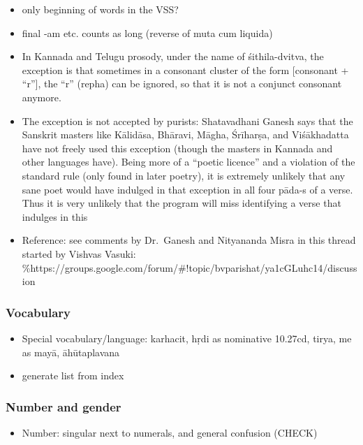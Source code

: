 \documentclass[11pt]{book}
\begin{document}
\begin{itemize}
\item
  only beginning of words in the VSS?
\item
  final -am etc. counts as long (reverse of muta cum liquida)
\item
  In Kannada and Telugu prosody, under the name of śithila-dvitva, the
  exception is that sometimes in a consonant cluster of the form
  {[}consonant + ``r''{]}, the ``r'' (repha) can be ignored, so that it
  is not a conjunct consonant anymore.
\item
  The exception is not accepted by purists: Shatavadhani Ganesh says
  that the Sanskrit masters like Kālidāsa, Bhāravi, Māgha, Śrīharṣa, and
  Viśākhadatta have not freely used this exception (though the masters
  in Kannada and other languages have). Being more of a ``poetic
  licence'' and a violation of the standard rule (only found in later
  poetry), it is extremely unlikely that any sane poet would have
  indulged in that exception in all four pāda-s of a verse. Thus it is
  very unlikely that the program will miss identifying a verse that
  indulges in this
\item
  Reference: see comments by Dr.~Ganesh and Nityananda Misra in this
  thread started by Vishvas Vasuki:
  \%https://groups.google.com/forum/\#!topic/bvparishat/ya1cGLuhc14/discussion
\end{itemize}


\subsubsection{Vocabulary}

\begin{itemize}

\item
  Special vocabulary/language: karhacit, hṛdi as nominative 10.27cd,
  tirya, me as mayā, āhūtaplavana
\item
  generate list from index
\end{itemize}


\subsubsection{Number and gender}

\begin{itemize}

\item
  Number: singular next to numerals, and general confusion (CHECK)
\end{itemize}
\end{document}
